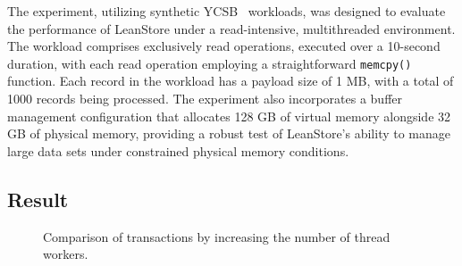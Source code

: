 The experiment, utilizing synthetic YCSB~\parencite{cooper2010benchmarking} workloads, was designed to evaluate the performance of LeanStore under a read-intensive, multithreaded environment. The workload comprises exclusively read operations, executed over a 10-second duration, with each read operation employing a straightforward \texttt{memcpy()} function. Each record in the workload has a payload size of 1 MB, with a total of 1000 records being processed. The experiment also incorporates a buffer management configuration that allocates 128 GB of virtual memory alongside 32 GB of physical memory, providing a robust test of LeanStore's ability to manage large data sets under constrained physical memory conditions.

\subsection{Result}

\begin{figure}[H]
    \centering
    \caption{Comparison of transactions by increasing the number of thread workers.}
    \label{fig:txn_comparison}
\end{figure}

